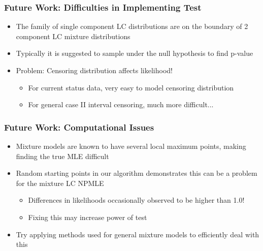 \documentclass[compress,red]{beamer}
\begin{document}
\begin{frame}

\frametitle{Future Work: Difficulties in Implementing Test}

	\begin{itemize}

	\item The family of single component LC distributions are on the boundary of 2 component LC mixture distributions
	
	\item Typically it is suggested to sample under the null hypothesis to find p-value
	
	\item Problem: Censoring distribution affects likelihood!
	
		\begin{itemize}
		
		\item For current status data, very easy to model censoring distribution
		
		\item For general case II interval censoring, much more difficult...
		
		\end{itemize}

	\end{itemize}

\end{frame}

\begin{frame}

\frametitle{Future Work: Computational Issues}

	\begin{itemize}
	
	\item Mixture models are known to have several local maximum points, making finding the true MLE difficult
	
	\item Random starting points in our algorithm demonstrates this can be a problem for the mixture LC NPMLE
	
		\begin{itemize}
		
		\item Differences in likelihoods occasionally observed to be higher than 1.0!
		
		\item Fixing this may increase power of test
		
		\end{itemize}
		
	\item Try applying methods used for general mixture models to efficiently deal with this
	
	\end{itemize}

\end{frame}
\end{document}

